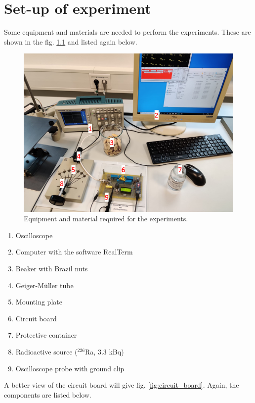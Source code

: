 \chapter{Set-up of experiment}
%
Some equipment and materials are needed to perform the experiments. These are shown in the fig. \ref{fig:setup} and listed again below.
%
\begin{figure}[H]
	\begin{center}
		\includegraphics[width=.9\textwidth]{aufbau/setup.PNG} %
		\caption{Equipment and material required for the experiments.}  
		\label{fig:setup} 
	\end{center}
\end{figure}
%
\begin{enumerate}
	\item Oscilloscope
	\item Computer with the software RealTerm
	\item Beaker with Brazil nuts
	\item Geiger-Müller tube
	\item Mounting plate
	\item Circuit board
	\item Protective container
	\item Radioactive source ($^{226}$Ra, 3.3 kBq)
	\item Oscilloscope probe with ground clip
\end{enumerate}
%
A better view of the circuit board will give fig. \ref{fig:circuit_board}. Again, the components are listed below.
%
